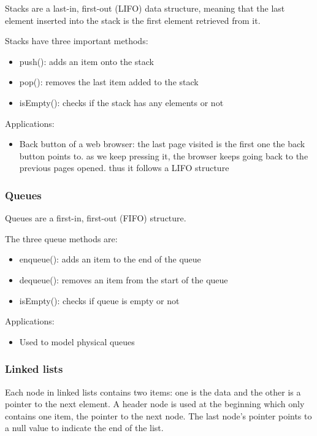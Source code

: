 \documentclass{article}
\begin{document}
Stacks are a last-in, first-out (LIFO) data structure, meaning that the last
element inserted into the stack is the first element retrieved from it.

Stacks have three important methods:
\begin{itemize}
    \item push(): adds an item onto the stack
    \item pop(): removes the last item added to the stack
    \item isEmpty(): checks if the stack has any elements or not
\end{itemize}

Applications:
\begin{itemize}
    \item Back button of a web browser: the last page visited is the first one
        the back button points to. as we keep pressing it, the browser keeps
        going back to the previous pages opened. thus it follows a LIFO
        structure
\end{itemize}

\subsubsection{Queues}

Queues are a first-in, first-out (FIFO) structure.

The three queue methods are:
\begin{itemize}
    \item enqueue(): adds an item to the end of the queue
    \item dequeue(): removes an item from the start of the queue
    \item isEmpty(): checks if queue is empty or not
\end{itemize}

Applications:
\begin{itemize}
    \item Used to model physical queues
\end{itemize}

\subsubsection{Linked lists}

Each node in linked lists contains two items: one is the data and the other is
a pointer to the next element. A header node is used at the beginning which
only contains one item, the pointer to the next node. The last node's pointer
points to a null value to indicate the end of the list.
\end{document}

